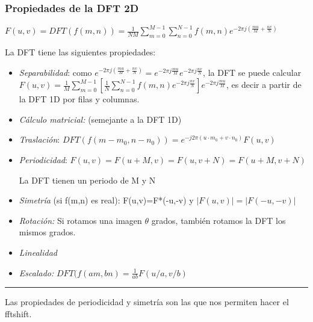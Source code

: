 
\begin{frame}
\frametitle{Propiedades de la DFT 2D}

\footnotesize

 \hspace{0.4cm} $F(u,v)=DFT(f(m,n))=\frac{1}{NM} \sum_{m=0}^{M-1} \sum_{n=0}^{N-1} f(m,n) e^{-2\pi j (\frac{mu}{M}+\frac{nv}{N})}$

 \vspace{0.2cm}

La DFT tiene las siguientes propiedades:

\begin{itemize}

\item \alert{\textit{Separabilidad}}: como $e^{-2\pi j (\frac{mu}{M}+\frac{nv}{N})}=e^{-2\pi j \frac{mu}{M}} e^{-2\pi j \frac{nv}{N}}$, la DFT se puede calcular $F(u,v)= \frac{1}{M} \sum_{m=0}^{M-1}\left[\frac{1}{N} \sum_{n=0}^{N-1} f(m,n) e^{-2\pi j \frac{nv}{N}} \right ] e^{-2\pi j \frac{mu}{M}}$, es decir a partir de la DFT 1D por filas y columnas.

\item  \alert{\textit{C\'{a}lculo matricial:}} (semejante a la DFT 1D)

\item  \alert{\textit{Traslaci\'{o}n}: }$ DFT(f(m-m_0,n-n_0))= e^{-j2 \pi (u \cdot m_0+v \cdot n_0)}F(u,v)$

\item \alert{\textit{Periodicidad}: } $F(u,v)=F(u+M,v)\!=\!F(u,v+N)\!=\!F(u+M,v+N)$

La DFT tienen un periodo de M y N

\item \alert{\textit{Simetr\'{i}a}} (si f(m,n) es real):  F(u,v)=F*(-u,-v) y  $|F(u,v)|=|F(-u,-v)|$

\item \alert{\textit{Rotaci\'{o}n:}} Si rotamos una imagen $\theta$ grados, tambi\'{e}n rotamos la DFT los mismos grados.

\item \alert{\textit{Linealidad}}

\item \alert{\textit{Escalado:}} $DFT(f(am,bn)=\frac{1}{ab}F(u/a,v/b)$


\end{itemize}


\hrule

\vspace{0.2cm}

\scriptsize
\color{gray} Las propiedades de periodicidad y simetr\'{i}a son las que nos permiten hacer el fftshift.

\end{frame}
